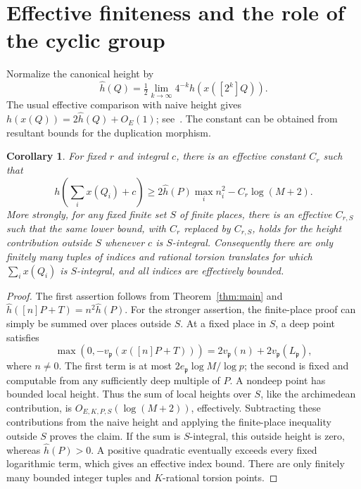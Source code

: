 \documentclass[11pt,a4paper]{article}
\newtheorem{corollary}[theorem]{Corollary}
\begin{document}
\section{Effective finiteness and the role of the cyclic group}
Normalize the canonical height by
\[
 \widehat h(Q)=\tfrac12\lim_{k\to\infty}4^{-k}h(x([2^k]Q)).
\]
The usual effective comparison with naive height gives
$h(x(Q))=2\widehat h(Q)+O_E(1)$; see~\cite[Chapter VIII,
Section 9]{Silverman}. The constant can be obtained from
resultant bounds for the duplication morphism.

\begin{corollary}\label{cor:growth}
For fixed $r$ and integral $c$, there is an effective constant
$C_r$ such that
\[
 h\left(\sum_i x(Q_i)+c\right)
 \ge 2\widehat h(P)\max_i n_i^2-C_r\log(M+2).
\]
More strongly, for any fixed finite set $S$ of finite places,
there is an effective $C_{r,S}$ such that the same lower bound,
with $C_r$ replaced by $C_{r,S}$, holds for the height contribution
outside $S$ whenever $c$ is $S$-integral. Consequently there are
only finitely many tuples of indices and rational torsion
translates for which $\sum_i x(Q_i)$ is $S$-integral, and all
indices are effectively bounded.
\end{corollary}
\begin{proof}
The first assertion follows from Theorem~\ref{thm:main} and
$\widehat h([n]P+T)=n^2\widehat h(P)$.
For the stronger assertion, the finite-place proof can simply be
summed over places outside $S$. At a fixed place in $S$, a deep
point satisfies
\[
 \max(0,-v_{\mathfrak p}(x([n]P+T)))
       =2v_{\mathfrak p}(n)+2v_{\mathfrak p}(L_{\mathfrak p}),
\]
where $n\ne0$. The first term is at most
$2e_{\mathfrak p}\log M/\log p$; the second is fixed and
computable from any sufficiently deep multiple of $P$. A
nondeep point has bounded local height. Thus the sum of local
heights over $S$, like the archimedean contribution, is
$O_{E,K,P,S}(\log(M+2))$, effectively. Subtracting these
contributions from the naive height and applying the
finite-place inequality outside $S$ proves the claim.
If the sum is $S$-integral, this outside height is zero, whereas
$\widehat h(P)>0$. A positive quadratic eventually exceeds every
fixed logarithmic term, which gives an effective index bound.
There are only finitely many bounded integer tuples and
$K$-rational torsion points.
\end{proof}
\end{document}
